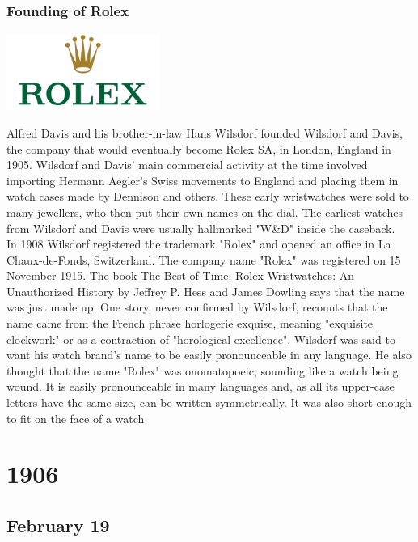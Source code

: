 \documentclass[11pt]{report}
\begin{document}
\section{}
\subsection{Founding of Rolex}
\vspace{2mm}\begin{center}\includegraphics[width=5cm]{./img/rolexLogo.jpg}\end{center}
Alfred Davis and his brother-in-law Hans Wilsdorf founded Wilsdorf and Davis, the company that would eventually become Rolex SA, in London, England in 1905. Wilsdorf and Davis' main commercial activity at the time involved importing Hermann Aegler's Swiss movements to England and placing them in watch cases made by Dennison and others. These early wristwatches were sold to many jewellers, who then put their own names on the dial. The earliest watches from Wilsdorf and Davis were usually hallmarked "W\&D" inside the caseback.\\
\indent In 1908 Wilsdorf registered the trademark "Rolex" and opened an office in La Chaux-de-Fonds, Switzerland. The company name "Rolex" was registered on 15 November 1915. The book The Best of Time: Rolex Wristwatches: An Unauthorized History by Jeffrey P. Hess and James Dowling says that the name was just made up. One story, never confirmed by Wilsdorf, recounts that the name came from the French phrase horlogerie exquise, meaning "exquisite clockwork" or as a contraction of "horological excellence". Wilsdorf was said to want his watch brand's name to be easily pronounceable in any language. He also thought that the name "Rolex" was onomatopoeic, sounding like a watch being wound. It is easily pronounceable in many languages and, as all its upper-case letters have the same size, can be written symmetrically. It was also short enough to fit on the face of a watch

\chapter{1906}
\section{February 19}
\end{document}
